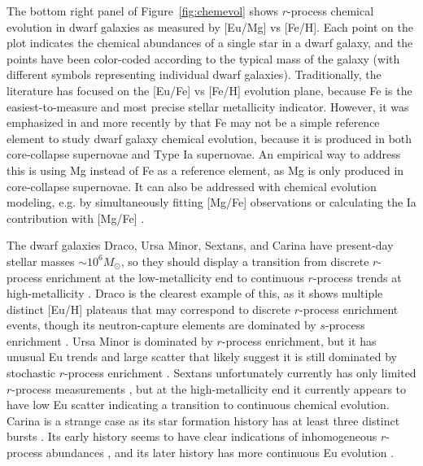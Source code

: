 \documentclass[letterpaper]{article}
\begin{document}
The bottom right panel of Figure~\ref{fig:chemevol} shows $r$-process chemical evolution in dwarf galaxies as measured by [Eu/Mg] vs [Fe/H]. Each point on the plot indicates the chemical abundances of a single star in a dwarf galaxy, and the points have been color-coded according to the typical mass of the galaxy (with different symbols representing individual dwarf galaxies).
Traditionally, the literature has focused on the [Eu/Fe] vs [Fe/H] evolution plane, because Fe is the easiest-to-measure and most precise stellar metallicity indicator. However, it was emphasized in \citet{Tolstoy2009} and more recently by \citet{Skuladottir2019} that Fe may not be a simple reference element to study dwarf galaxy chemical evolution, because it is produced in both core-collapse supernovae and Type Ia supernovae.
An empirical way to address this is using Mg instead of Fe as a reference element, as Mg is only produced in core-collapse supernovae. It can also be addressed with chemical evolution modeling, e.g. by simultaneously fitting [Mg/Fe] observations \citep[e.g.,][]{Molero2021,delosReyes2022} or calculating the Ia contribution with [Mg/Fe] \citep[e.g.,][]{Kirby2019}.

The dwarf galaxies Draco, Ursa Minor, Sextans, and Carina have present-day stellar masses $\sim 10^6 M_\odot$, so they should display a transition from discrete $r$-process enrichment at the low-metallicity end to continuous $r$-process trends at high-metallicity \citep{Duggan2018,Skuladottir2019}.
Draco is the clearest example of this, as it shows multiple distinct [Eu/H] plateaus that may correspond to discrete $r$-process enrichment events, though its neutron-capture elements are dominated by $s$-process enrichment \citep{Cohen2009,Tsujimoto2015,Tsujimoto2017}.
Ursa Minor is dominated by $r$-process enrichment, but it has unusual Eu trends and large scatter that likely suggest it is still dominated by stochastic $r$-process enrichment \citep{Cohen2010,McWilliam2018}.
Sextans unfortunately currently has only limited $r$-process measurements \citep{Theler2020, Reichert2020}, but at the high-metallicity end it currently appears to have low Eu scatter indicating a transition to continuous chemical evolution.
Carina is a strange case as its star formation history has at least three distinct bursts \citep{Hurley-Keller1998,Weisz2014}.
Its early history seems to have clear indications of inhomogeneous $r$-process abundances \citep{Venn2012}, and its later history has more continuous Eu evolution \citep{Lemasle2012, Norris2017}.
\end{document}
